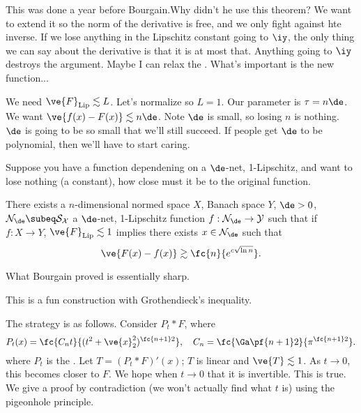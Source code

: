 This was done a year before Bourgain.Why didn't he use this theorem? We want to extend it so the norm of the derivative is free, and we only fight against hte inverse. If we lose anything in the Lipschitz constant going to $\iy$, the only thing we can say about the derivative is that it is at most that. Anything going to $\iy$ destroys the argument. %
Maybe I can relax the . What's important is the new function... %

We need $\ve{F}_{\text{Lip}}\lesssim L$. 
Let's normalize so $L=1$. Our parameter is $\tau=n\de$.  We want $\ve{f(x)-F(x)}\lesssim n\de$. Note $\de$ is small, so losing $n$ is nothing. $\de$ is going to be so small that we'll still succeed. If people get $\de$ to be polynomial, then we'll have to start caring.

Suppose you have a function dependening on a $\de$-net, 1-Lipschitz, and want to lose nothing (a constant), how close must it be to the original function.
\begin{thm}
There exists a $n$-dimensional normed space $X$, Banach space $Y$, $\de>0$, $\cal N_\de\subeq S_X$ a $\de$-net, 1-Lipschitz function $f:\cal N_\de\to Y$ such that if $f:X\to Y$, $\ve{F}_{\text{Lip}}\lesssim 1$ implies there exists $x\in \cal N_\de$ such that 
\[
\ve{F(x)-f(x)}\gtrsim \fc{n}{e^{c\sqrt{\ln n}}}.
\]
\end{thm}
What Bourgain proved is essentially sharp.

This is a fun construction with Grothendieck's inequality.


The strategy is as follows. Consider $P_t*F$, where 
\[
P_t(x)=\fc{C_nt}{(t^2+\ve{x}_2^2)^{\fc{n+1}2}}, \quad C_n=\fc{\Ga\pf{n+1}2}{\pi^{\fc{n+1}2}}.
\]
where $P_t$ is the . 
Let $T=(P_t*F)'(x)$; $T$ is linear and $\ve{T}\lesssim 1$. As $t\to 0$, this becomes closer to $F$. We hope when $t\to 0$ that it is invertible. This is true. We give a proof by contradiction (we won't actually find what $t$ is) using the pigeonhole principle. %

